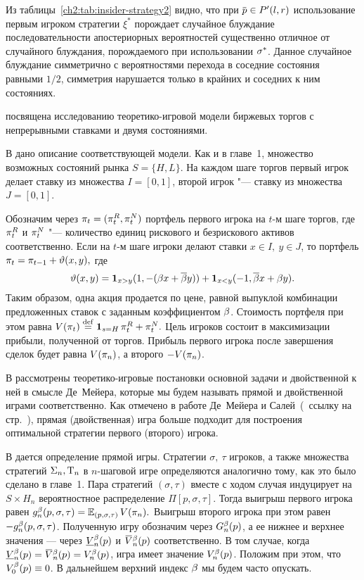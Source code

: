 Из таблицы~\ref{ch2:tab:insider-strategy2} видно, что при $\p \in P'(l, r)$ использование первым игроком стратегии $\xi^*$ порождает случайное блуждание последовательности апостериорных вероятностей существенно отличное от случайного блуждания, порождаемого при использовании $\sigma^*$.
Данное случайное блуждание симметрично с вероятностями перехода в соседние состояния равными $1/2$, симметрия нарушается только в крайних и соседних к ним состояниях.

 посвящена исследованию теоретико-игровой модели биржевых торгов с непрерывными ставками и двумя состояниями. 

В  дано описание соответствующей модели.
Как и в главе~1, множество возможных состояний рынка $S = \{H, L\}$.
На каждом шаге торгов первый игрок делает ставку из множества $I = [0, 1]$, второй игрок "--- ставку из множества $J = [0, 1]$.

Обозначим через $\pi_{t} = (\pi_{t}^R, \pi_{t}^N)$ портфель первого игрока на $t$-м шаге торгов, где $\pi_{t}^R$ и $\pi_{t}^N$ "--- количество единиц рискового и безрискового активов соответственно.
Если на $t$-м шаге игроки делают ставки $x \in I,\ y \in J$, то портфель 
$
\pi_{t} = \pi_{t-1} + \vartheta(x, y),
$
где
\begin{equation}\label{ch3:eq:trans-mech}
  \vartheta(x, y) = \mathbf{1}_{x > y} (1, -(\beta x + {{\overline{\beta}}} y)) +
  \mathbf{1}_{x < y} (-1, {{\overline{\beta}}} x + \beta y).
\end{equation}
Таким образом, одна акция продается по цене, равной выпуклой комбинации предложенных ставок с заданным коэффициентом $\beta$.
Стоимость портфеля при этом равна
$
  V(\pi_{t}) \overset{\mathrm{def}}{=} \mathbf{1}_{s = H} \, \pi_{t}^R + \pi_{t}^N.
$
Цель игроков состоит в максимизации прибыли, полученной от торгов.
Прибыль первого игрока после завершения сделок будет равна $V(\pi_{n})$, а второго $-V(\pi_{n})$.

В  рассмотрены теоретико-игровые постановки основной задачи и двойственной к ней в смысле Де~Мейера, которые мы будем называть прямой и двойственной играми соответственно.
Как отмечено в работе Де~Мейера и Салей~(\seename~ссылку на стр.~\pageref{demeyer02ref}), прямая (двойственная) игра больше подходит для построения оптимальной стратегии первого (второго) игрока.

В  дается определение прямой игры.
Стратегии $\sigma,\ \tau$ игроков, а также множества стратегий $\Sigma_n, \mathrm{T}_n$ в $n$-шаговой игре определяются аналогично тому, как это было сделано в главе~1.
Пара стратегий $(\sigma, \tau)$ вместе с ходом случая индуцирует на $S \times H_n$ вероятностное распределение $\Pi[p, \sigma, \tau]$.
Тогда выигрыш первого игрока равен
$
  g^{\beta}_n(p, \sigma, \tau) = \operatorname{\mathbb{E}}_{( p, \sigma, \tau )} V(\pi_{n}).
$
Выигрыш второго игрока при этом равен $-g^{\beta}_n(p, \sigma, \tau)$.
Полученную игру обозначим через $G^{\beta}_n(p)$, а ее нижнее и верхнее значения --- через $\LV[\Co]{n}(p)$ и $\HV[\Co]{n}(p)$ соответственно.
В том случае, когда $\LV[\Co]{n}(p) = \HV[\Co]{n}(p) = V^\Co_n(p)$, игра имеет значение $V^{\beta}_n(p)$.
Положим при этом, что $V^{\beta}_0(p) \equiv 0$.
В дальнейшем верхний индекс $\beta$ мы будем часто опускать.

